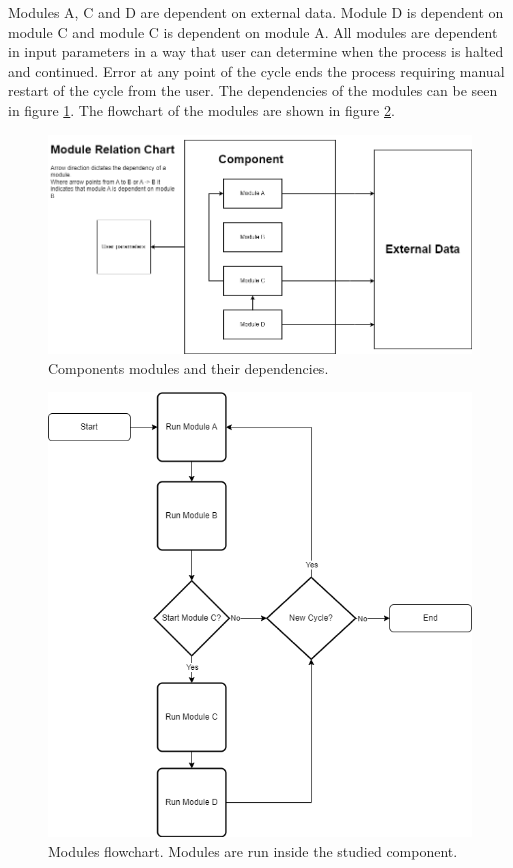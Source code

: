 Modules A, C and D are dependent on external data.
Module D is dependent on module C and module C is dependent on module A.
All modules are dependent in input parameters in a way that user can determine when the process is halted and continued.
Error at any point of the cycle ends the process requiring manual restart of the cycle from the user.
The dependencies of the modules can be seen in figure \ref{figure:module:relation}.
The flowchart of the modules are shown in figure \ref{figure:module:flow}.

\begin{figure}
    \includegraphics[width=\textwidth]{images/modules_relation_uml.png}
    \caption{Components modules and their dependencies.}
    \label{figure:module:relation}
\end{figure}


\begin{figure}
    \includegraphics[width=\textwidth]{images/module_flow_chart.png}
    \caption{Modules flowchart. Modules are run inside the studied component.}
    \label{figure:module:flow}
\end{figure}

